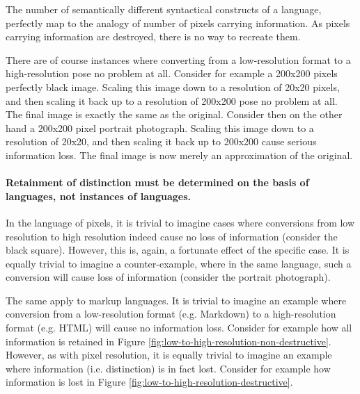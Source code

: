 \documentclass{scrreprt}
\begin{document}
The number of semantically different syntactical constructs of a language, perfectly map to the analogy of number of pixels carrying information. As pixels carrying information are destroyed, there is no way to recreate them.

There are of course instances where converting from a low-resolution format to a high-resolution pose no problem at all. Consider for example a 200x200 pixels perfectly black image. Scaling this image down to a resolution of 20x20 pixels, and then scaling it back up to a resolution of 200x200 pose no problem at all. The final image is exactly the same as the original. Consider then on the other hand a 200x200 pixel portrait photograph. Scaling this image down to a resolution of 20x20, and then scaling it back up to 200x200 cause serious information loss. The final image is now merely an approximation of the original.

\paragraph{Retainment of distinction must be determined on the basis of languages, not instances of languages.} In the language of pixels, it is trivial to imagine cases where conversions from low resolution to high resolution indeed cause no loss of information (consider the black square). However, this is, again, a fortunate effect of the specific case. It is equally trivial to imagine a counter-example, where in the same language, such a conversion will cause loss of information (consider the portrait photograph).

The same apply to markup languages. It is trivial to imagine an example where conversion from a low-resolution format (e.g. Markdown) to a high-resolution format (e.g. HTML) will cause no information loss. Consider for example how all information is retained in Figure \ref{fig:low-to-high-resolution-non-destructive}. However, as with pixel resolution, it is equally trivial to imagine an example where information (i.e. distinction) is in fact lost. Consider for example how information is lost in Figure \ref{fig:low-to-high-resolution-destructive}.
\end{document}

